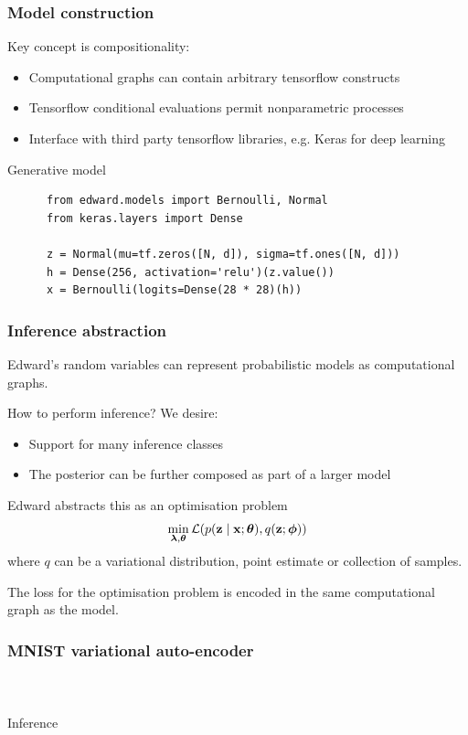 \documentclass[10pt]{beamer}
\begin{document}
\begin{frame}[fragile]
  \frametitle{Model construction}
  Key concept is compositionality:
  \begin{itemize}
    \item Computational graphs can contain arbitrary tensorflow constructs
    \item Tensorflow conditional evaluations permit nonparametric processes
    \item Interface with third party tensorflow libraries, e.g. Keras for deep learning
  \end{itemize}
  \begin{block}{Generative model}
    \begin{verbatim}
      from edward.models import Bernoulli, Normal
      from keras.layers import Dense

      z = Normal(mu=tf.zeros([N, d]), sigma=tf.ones([N, d]))
      h = Dense(256, activation='relu')(z.value())
      x = Bernoulli(logits=Dense(28 * 28)(h))
    \end{verbatim}
  \end{block}
\end{frame}


\begin{frame}
  \frametitle{Inference abstraction}
  Edward's random variables can represent probabilistic models as computational graphs.

  How to perform inference? We desire:
  \begin{itemize}
    \item Support for many inference classes
    \item The posterior can be further composed as part of a larger model
  \end{itemize}

  Edward abstracts this as an optimisation problem
  \begin{align*}
    \label{eq:inference-optimization}
    \min_{\boldsymbol{\mathbf{\lambda}},\boldsymbol{\mathbf{\theta}}}
    \mathcal{L}(
      p(\mathbf{z} \mid \mathbf{x}; \boldsymbol{\mathbf{\theta}}),
      q(\mathbf{z} ; \boldsymbol{\mathbf{\phi}})
    )
  \end{align*}
  where $q$ can be a variational distribution, point estimate or collection of samples.

  The loss for the optimisation problem is encoded in the same computational graph as the model.
\end{frame}


\begin{frame}
  \frametitle{MNIST variational auto-encoder}
  \begin{columns}
    \begin{column}{0.2\textwidth}
      
    \end{column}
    \begin{column}{0.8\textwidth}
      \inputminted[fontsize=\small]{python}{python/mnist-vae.py}
    \end{column}
  \end{columns}

  \begin{block}{Inference}
    \inputminted{python}{python/vae-inference.py}
  \end{block}
\end{frame}
\end{document}
